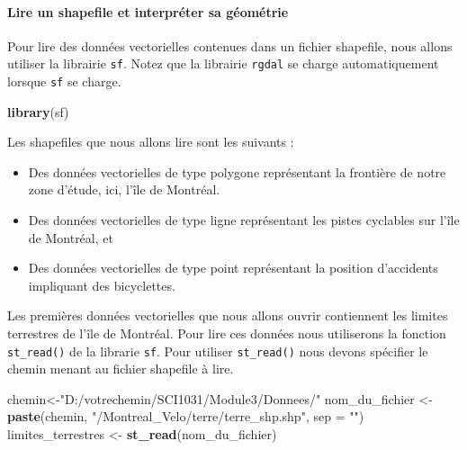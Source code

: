 \documentclass[]{article}
\newenvironment{Shaded}{\begin{snugshade}}{\end{snugshade}}
\newcommand{\KeywordTok}[1]{\textcolor[rgb]{0.13,0.29,0.53}{\textbf{#1}}}
\newcommand{\DataTypeTok}[1]{\textcolor[rgb]{0.13,0.29,0.53}{#1}}
\newcommand{\StringTok}[1]{\textcolor[rgb]{0.31,0.60,0.02}{#1}}
\newcommand{\NormalTok}[1]{#1}
\providecommand{\tightlist}{%
  \setlength{\itemsep}{0pt}\setlength{\parskip}{0pt}}
\let\oldparagraph\paragraph
\renewcommand{\paragraph}[1]{\oldparagraph{#1}\mbox{}}
\begin{document}
\paragraph{Lire un shapefile et interpréter sa
géométrie}\label{lire-un-shapefile-et-interpruxe9ter-sa-guxe9omuxe9trie}

Pour lire des données vectorielles contenues dans un fichier shapefile,
nous allons utiliser la librairie \texttt{sf}. Notez que la librairie
\texttt{rgdal} se charge automatiquement lorsque \texttt{sf} se charge.

\begin{Shaded}
\begin{Highlighting}[]
\KeywordTok{library}\NormalTok{(sf)}
\end{Highlighting}
\end{Shaded}

Les shapefiles que nous allons lire sont les suivants :

\begin{itemize}
\tightlist
\item
  Des données vectorielles de type polygone représentant la frontière de
  notre zone d'étude, ici, l'île de Montréal.
\item
  Des données vectorielles de type ligne représentant les pistes
  cyclables sur l'île de Montréal, et
\item
  Des données vectorielles de type point représentant la position
  d'accidents impliquant des bicyclettes.
\end{itemize}

Les premières données vectorielles que nous allons ouvrir contiennent
les limites terrestres de l'île de Montréal. Pour lire ces données nous
utiliserons la fonction \texttt{st\_read()} de la librarie \texttt{sf}.
Pour utiliser \texttt{st\_read()} nous devons spécifier le chemin menant
au fichier shapefile à lire.

\begin{Shaded}
\begin{Highlighting}[]
\NormalTok{chemin<-}\StringTok{"D:/votrechemin/SCI1031/Module3/Donnees/"}
\NormalTok{nom_du_fichier <-}\StringTok{ }\KeywordTok{paste}\NormalTok{(chemin, }\StringTok{"/Montreal_Velo/terre/terre_shp.shp"}\NormalTok{, }\DataTypeTok{sep =} \StringTok{""}\NormalTok{)}
\NormalTok{limites_terrestres <-}\StringTok{ }\KeywordTok{st_read}\NormalTok{(nom_du_fichier)}
\end{Highlighting}
\end{Shaded}
\end{document}
